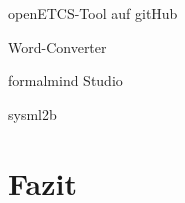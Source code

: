 \documentclass[twoside]{article}
\begin{document}
\begin{multicols}{2}
openETCS-Tool auf gitHub

Word-Converter

formalmind Studio

sysml2b

\section{Fazit}


\end{multicols}

\titleformat{\section}[block]{\large\scshape\centering{}}{}{1em}{}



\end{document}
